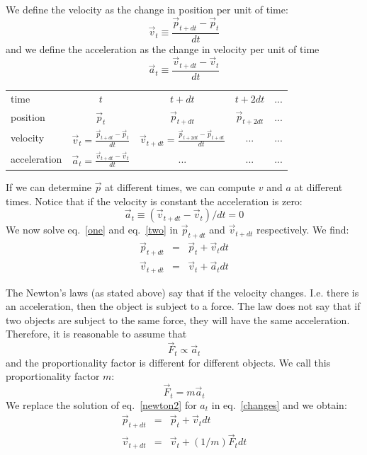 \documentclass[12pt]{article}
\begin{document}
We define the velocity as the change in position per unit of time:
\begin{equation}
\vec v_t \equiv \frac{\vec p_{t+dt}-\vec p_t}{dt}
\label{one}
\end{equation}
and we define the acceleration as the change in velocity per unit of time
\begin{equation}
\vec a_t \equiv \frac{\vec v_{t+dt}-\vec v_t}{dt}
\label{two}
\end{equation}

\begin{center}
\begin{tabular}{lcccc} \hline
time & $t$ & $t+dt$ & $t+2dt$ & ... \\
position & $\vec p_t$ & $\vec p_{t+dt}$ & $\vec p_{t+2dt}$ & ... \\
velocity & $\vec v_t = \frac{\vec p_{t+dt}-\vec p_t}{dt}$ & $\vec v_{t+dt} = \frac{\vec p_{t+2dt}-\vec p_{t+dt}}{dt}$ & ... & ... \\
acceleration & $\vec a_t = \frac{\vec v_{t+dt}-\vec v_t}{dt}$ & ... & ... & ... \\ \hline
\end{tabular}
\end{center}

If we can determine $\vec p$ at different times, we can compute $v$ and $a$ at different times. Notice that if the velocity is constant the acceleration is zero:
\begin{equation}
\vec a_t \equiv (\vec v_{t+dt}-\vec v_t)/dt = 0
\end{equation}
We now solve eq.~\ref{one} and eq.~\ref{two} in $\vec p_{t+dt}$ and $\vec v_{t+dt}$ respectively. We find:
\begin{eqnarray}
\vec p_{t+dt} &=& \vec p_t + \vec v_t dt \\ 
\vec v_{t+dt} &=& \vec v_t + \vec a_t dt 
\label{changes}
\end{eqnarray}

The Newton's laws (as stated above) say that if the velocity changes. I.e. there is an acceleration, then the object is subject to a force. The law does not say that if two objects are subject to the same force, they will have the same acceleration. Therefore, it is reasonable to assume that
\begin{equation}
\vec F_t \propto \vec a_t
\end{equation}
and the proportionality factor is different for different objects. We call this proportionality factor $m$:
\begin{equation}
\vec F_t = m \vec a_t
\label{newton2}
\end{equation}
We replace the solution of eq.~\ref{newton2} for $a_t$ in eq.~\ref{changes} and we obtain:
\begin{eqnarray}
\vec p_{t+dt} &=& \vec p_t + \vec v_t dt \label{p_update} \\
\vec v_{t+dt} &=& \vec v_t + (1/m) \vec F_t dt \label{v_update}
\end{eqnarray}
\end{document}
